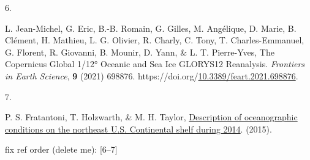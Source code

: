 \documentclass[
  10pt,
  letterpaper,
  DIV=11,
  numbers=noendperiod]{scrartcl}
\newlength{\cslhangindent}
\newlength{\csllabelwidth}
\newenvironment{CSLReferences}[2] %
 {\begin{list}{}{%
  \setlength{\itemindent}{0pt}
  \setlength{\leftmargin}{0pt}
  \setlength{\parsep}{0pt}
  \ifodd #1
   \setlength{\leftmargin}{\cslhangindent}
   \setlength{\itemindent}{-1\cslhangindent}
  \fi
  \setlength{\itemsep}{#2\baselineskip}}}
 {\end{list}}
\newcommand{\CSLLeftMargin}[1]{\parbox[t]{\csllabelwidth}{\strut#1\strut}}
\newcommand{\CSLRightInline}[1]{\parbox[t]{\linewidth - \csllabelwidth}{\strut#1\strut}}
\begin{document}
\begin{CSLReferences}{0}{0}
\CSLLeftMargin{6. }%
\CSLRightInline{L. Jean-Michel, G. Eric, B.-B. Romain, G. Gilles, M.
Angélique, D. Marie, B. Clément, H. Mathieu, L. G. Olivier, R. Charly,
C. Tony, T. Charles-Emmanuel, G. Florent, R. Giovanni, B. Mounir, D.
Yann, \& L. T. Pierre-Yves, The {Copernicus} {Global} 1/12° {Oceanic}
and {Sea} {Ice} {GLORYS12} {Reanalysis}. \emph{Frontiers in Earth
Science}, \textbf{9} (2021) 698876.
https://doi.org/\href{https://doi.org/10.3389/feart.2021.698876}{10.3389/feart.2021.698876}.}

\CSLLeftMargin{7. }%
\CSLRightInline{P. S. Fratantoni, T. Holzwarth, \& M. H. Taylor,
\href{https://repository.library.noaa.gov/view/noaa/5047}{Description of
oceanographic conditions on the northeast {U}.{S}. Continental shelf
during 2014}. (2015).}

\end{CSLReferences}

fix ref order (delete me): {[}6--7{]}
\end{document}
